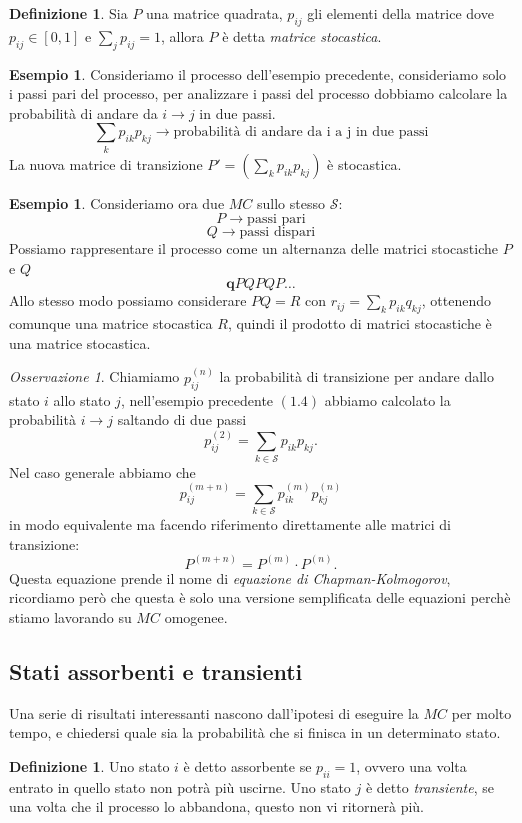 \documentclass{article}
\theoremstyle{definition}
\newtheorem{definition}[theorem]{Definizione}
\newtheorem{example}[theorem]{Esempio}
\theoremstyle{remark}
\newtheorem{remark}[theorem]{Osservazione}
\begin{document}
\begin{definition}
    Sia $P$ una matrice quadrata, $p_{ij}$ gli elementi della matrice dove $p_{ij}\in[0,1]$ e $\sum_j p_{ij} = 1$, 
    allora $P$ è detta \textit{matrice stocastica}.
\end{definition}
\begin{example}
    Consideriamo il processo dell'esempio precedente, consideriamo solo i passi pari del processo, per analizzare i passi del processo dobbiamo calcolare
    la probabilità di andare da $i\to j$ in due passi. 
    $$\sum_k p_{ik}p_{kj}\rightarrow\text{probabilità di andare da i a j in due passi}$$
    La nuova matrice di transizione $P' = (\sum_k p_{ik}p_{kj})$  è stocastica.
\end{example}
\begin{example}
    Consideriamo ora due $MC$ sullo stesso $\mathcal{S}$:
    $$ P\to \text{passi pari}$$
    $$ Q\to \text{passi dispari}$$
    Possiamo rappresentare il processo come un alternanza delle matrici stocastiche $P$ e $Q$
    $$\boldsymbol{q}PQPQP\dots$$
    Allo stesso modo possiamo considerare  $PQ=R$ con $r_{ij} = \sum_k p_{ik}q_{kj}$, ottenendo comunque una matrice stocastica $R$,
    quindi il prodotto di matrici stocastiche è una matrice stocastica.
\end{example}
\begin{remark}   
Chiamiamo $p^{(n)}_{ij}$ la probabilità di transizione per andare dallo stato $i$ allo stato $j$, 
nell'esempio precedente $\mathbf{(1.4)}$ abbiamo calcolato la probabilità $i\to j$ saltando di due passi
$$ p^{(2)}_{ij} = \sum_{k\in\mathcal{S}} p_{ik}p_{kj}.$$
Nel caso generale abbiamo che
$$p^{(m+n)}_{ij} = \sum_{k\in\mathcal{S}} p^{(m)}_{ik} p^{(n)}_{kj}$$
in modo equivalente ma facendo riferimento direttamente alle matrici di transizione:
$$P^{(m+n)} = P^{(m)}\cdot P^{(n)}.$$
Questa equazione prende il nome di \textit{equazione di Chapman-Kolmogorov}, ricordiamo però che questa è solo una 
versione semplificata delle equazioni perchè stiamo lavorando su $MC$ omogenee.
\end{remark}

\subsection{Stati assorbenti e transienti}
Una serie di risultati interessanti nascono dall'ipotesi di eseguire la $MC$ per molto tempo, e chiedersi quale sia la probabilità che 
si finisca in un determinato stato.
\begin{definition}
    Uno stato $i$ è detto assorbente se $p_{ii} = 1$, ovvero una volta entrato in quello stato non potrà più uscirne. Uno stato $j$ è detto \textit{transiente}, 
    se una volta che il processo lo abbandona, questo non vi ritornerà più.
\end{definition}
\end{document}
